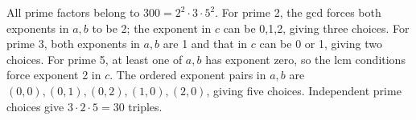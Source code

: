 All prime factors belong to $300=2^2\cdot3\cdot5^2$. For prime 2, the gcd forces both exponents in $a,b$ to be 2; the exponent in $c$ can be 0,1,2, giving three choices. For prime 3, both exponents in $a,b$ are 1 and that in $c$ can be 0 or 1, giving two choices. For prime 5, at least one of $a,b$ has exponent zero, so the lcm conditions force exponent 2 in $c$. The ordered exponent pairs in $a,b$ are $(0,0),(0,1),(0,2),(1,0),(2,0)$, giving five choices. Independent prime choices give $\boxed{3\cdot2\cdot5=30}$ triples.
